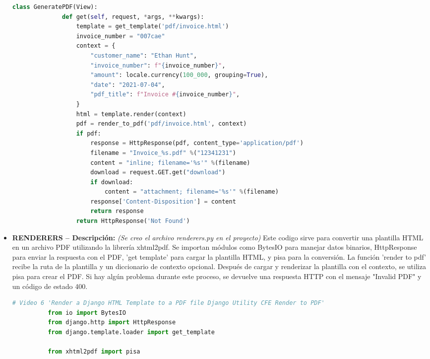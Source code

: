 \documentclass{article}
\begin{document}
\begin{itemize}
\begin{lstlisting}[language=Python]
          class GeneratePDF(View):
              def get(self, request, *args, **kwargs):
                  template = get_template('pdf/invoice.html')
                  invoice_number = "007cae"
                  context = {
                      "customer_name": "Ethan Hunt",
                      "invoice_number": f"{invoice_number}",
                      "amount": locale.currency(100_000, grouping=True),
                      "date": "2021-07-04",
                      "pdf_title": f"Invoice #{invoice_number}",
                  }
                  html = template.render(context)
                  pdf = render_to_pdf('pdf/invoice.html', context)
                  if pdf:
                      response = HttpResponse(pdf, content_type='application/pdf')
                      filename = "Invoice_%s.pdf" %("12341231")
                      content = "inline; filename='%s'" %(filename)
                      download = request.GET.get("download")
                      if download:
                          content = "attachment; filename='%s'" %(filename)
                      response['Content-Disposition'] = content
                      return response
                  return HttpResponse('Not Found')
        \end{lstlisting}
      \item \textbf{RENDERERS -- Descripción: }\textit{(Se creo el archivo renderers.py en el proyecto)} Este codigo sirve para 
        convertir una plantilla HTML en un archivo PDF utilizando la librería xhtml2pdf. Se importan módulos como BytesIO para 
        manejar datos binarios, HttpResponse para enviar la respuesta con el PDF, 'get template' para cargar la plantilla HTML, 
        y pisa para la conversión.
        \newline
        La función 'render to pdf' recibe la ruta de la plantilla y un diccionario de contexto opcional. Después de cargar y 
        renderizar la plantilla con el contexto, se utiliza pisa para crear el PDF. Si hay algún problema durante este proceso, 
        se devuelve una respuesta HTTP con el mensaje "Invalid PDF" y un código de estado 400.
        \begin{lstlisting}[language=Python]
          # Video 6 'Render a Django HTML Template to a PDF file Django Utility CFE Render to PDF'
          from io import BytesIO
          from django.http import HttpResponse
          from django.template.loader import get_template

          from xhtml2pdf import pisa


\end{lstlisting}
\end{itemize}
\end{document}
